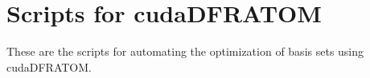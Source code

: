 \chapter{Scripts for cudaDFRATOM}
\label{app:cuda_dfratom_scripts}
These are the scripts for automating the optimization of basis sets using cudaDFRATOM.


